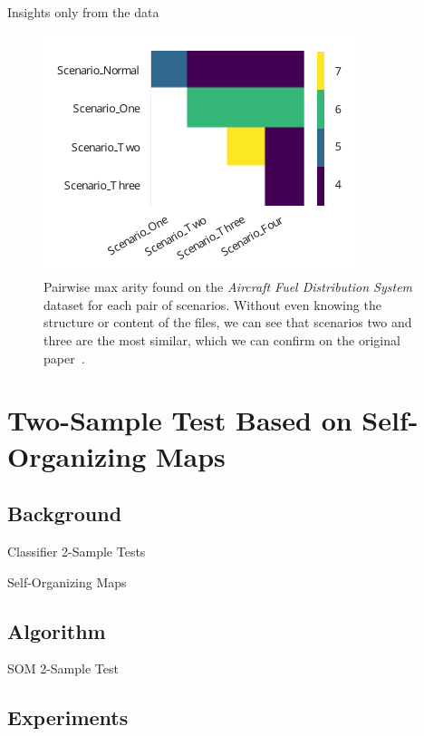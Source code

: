 \documentclass[10pt]{beamer}
\begin{document}
\begin{frame}{Insights only from the data}
\begin{figure}
    \centering
    \includegraphics{afds}
    \caption{
        Pairwise max arity found on the \emph{Aircraft Fuel Distribution System} dataset for each pair of scenarios.
        Without even knowing the structure or content of the files, we can see that
        scenarios two and three are the most similar, which we can confirm on the
        original paper~\cite{Gheraibia2019}.
    }
\end{figure}
\end{frame}

\section{Two-Sample Test Based on Self-Organizing Maps}

\subsection{Background}

\begin{frame}{Classifier 2-Sample Tests}
\end{frame}

\begin{frame}{Self-Organizing Maps}
\end{frame}

\subsection{Algorithm}

\begin{frame}{SOM 2-Sample Test}
\end{frame}

\subsection{Experiments}
\end{document}
